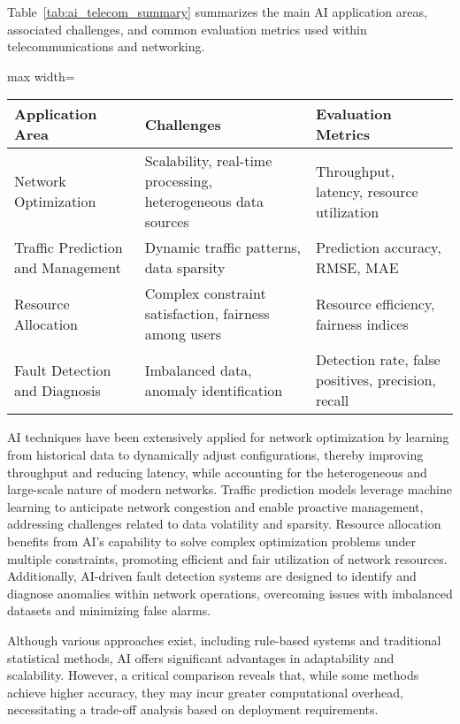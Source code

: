 \documentclass[sigconf]{acmart}
\begin{document}
Table~\ref{tab:ai_telecom_summary} summarizes the main AI application areas, associated challenges, and common evaluation metrics used within telecommunications and networking.

\begin{table*}[htbp]
\centering
\caption{Summary of AI Applications, Challenges, and Evaluation Metrics in Telecommunications and Networking}
\label{tab:ai_telecom_summary}
\begin{adjustbox}{max width=\textwidth}
\begin{tabular}{@{}lll@{}}
\toprule
\textbf{Application Area} & \textbf{Challenges} & \textbf{Evaluation Metrics} \\ \midrule
Network Optimization & Scalability, real-time processing, heterogeneous data sources & Throughput, latency, resource utilization \\
Traffic Prediction and Management & Dynamic traffic patterns, data sparsity & Prediction accuracy, RMSE, MAE \\
Resource Allocation & Complex constraint satisfaction, fairness among users & Resource efficiency, fairness indices \\
Fault Detection and Diagnosis & Imbalanced data, anomaly identification & Detection rate, false positives, precision, recall \\ \bottomrule
\end{tabular}
\end{adjustbox}
\end{table*}

AI techniques have been extensively applied for network optimization by learning from historical data to dynamically adjust configurations, thereby improving throughput and reducing latency, while accounting for the heterogeneous and large-scale nature of modern networks. Traffic prediction models leverage machine learning to anticipate network congestion and enable proactive management, addressing challenges related to data volatility and sparsity. Resource allocation benefits from AI’s capability to solve complex optimization problems under multiple constraints, promoting efficient and fair utilization of network resources. Additionally, AI-driven fault detection systems are designed to identify and diagnose anomalies within network operations, overcoming issues with imbalanced datasets and minimizing false alarms.

Although various approaches exist, including rule-based systems and traditional statistical methods, AI offers significant advantages in adaptability and scalability. However, a critical comparison reveals that, while some methods achieve higher accuracy, they may incur greater computational overhead, necessitating a trade-off analysis based on deployment requirements.
\end{document}
